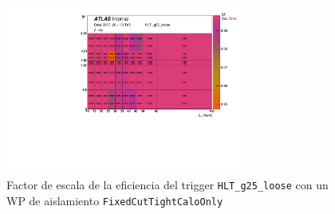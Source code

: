 \begin{figure}

	\centering


  \includegraphics[width=0.7\textwidth]{images/2017_h_sf_et_eta_tr_HLT_g25_loose_FixedCutTightCaloOnly.pdf}
  \caption{Factor de escala de la eficiencia del trigger \texttt{HLT\_g25\_loose} con un WP de aislamiento \texttt{FixedCutTightCaloOnly} 
 \commentNotaIII
}

  \label{SFfig}
\end{figure}



